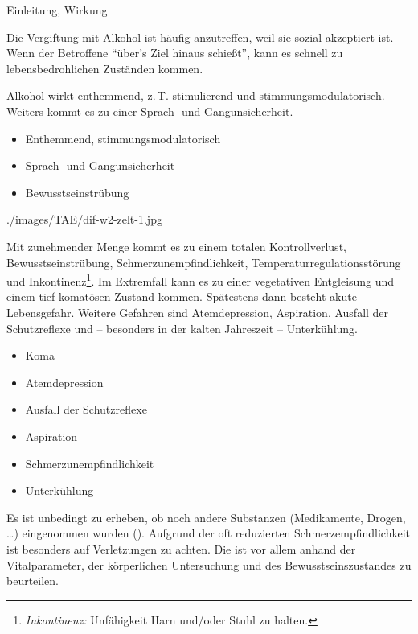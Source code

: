 \TextSlidePicture
{Einleitung, Wirkung}%
{%
Die Vergiftung mit Alkohol ist häufig anzutreffen, weil sie
sozial akzeptiert ist.
Wenn der Betroffene \enquote{über's Ziel hinaus schießt},
kann es schnell zu lebensbedrohlichen Zuständen kommen.

Alkohol  wirkt ent\-hemm\-end, z.\,T. stimulierend und
stimmungs\-modu\-lator\-isch. Weiters kommt es zu einer Sprach- 
und Gangunsicherheit. 

}%
{%
\begin{itemize}
    \item Enthemmend, stimmungsmodulatorisch
    \item Sprach- und Gangunsicherheit
    \item Bewusstseinstrübung
\end{itemize}}%
{./images/TAE/dif-w2-zelt-1.jpg}%
{}%
{}%
{}%
{}%



\TextSlide{\TxGefahren}
{%
Mit zunehmender Menge kommt es zu einem totalen
Kontrollverlust, Bewusstseinstrübung,
Schmerzunempfindlichkeit, Temperaturregulationsstörung und
Inkontinenz\footnote{\emph{Inkontinenz:} Unfähigkeit Harn
und/oder Stuhl zu halten.}. Im Extremfall kann es zu einer 
vegetativen Entgleisung und einem tief komatösen Zustand 
kommen. Spätestens dann besteht akute Lebensgefahr. Weitere 
Gefahren sind Atemdepression, Aspiration, Ausfall der 
Schutzreflexe und -- besonders in der kalten Jahreszeit --
Unterkühlung.
}{%
\begin{itemize}
    \item Koma
    \item Atemdepression
    \item  Ausfall der Schutzreflexe
    \item Aspiration
    \item Schmerzunempfindlichkeit
    \item Unterkühlung
\end{itemize}
}{}{}{}


Es ist unbedingt zu erheben, ob noch andere Substanzen
(Medikamente, Drogen, \ldots) eingenommen wurden
(). Aufgrund der oft reduzierten
Schmerzempfindlichkeit ist besonders auf Verletzungen zu
achten.
Die  ist vor allem anhand der
Vitalparameter, der körperlichen Untersuchung und des
Bewusstseinszustandes zu beurteilen. 

